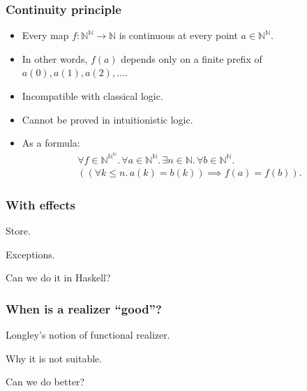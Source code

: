 \documentclass[t]{beamer}
\newcommand{\NN}{\mathbb{N}}
\begin{document}
\begin{frame}
  \frametitle{Continuity principle}

  \begin{itemize}
  \item 
    Every map $f : \NN^\NN \to \NN$ is continuous at every point $a \in
    \NN^\NN$.
  \item 
    In other words, $f(a)$ depends only on a finite prefix of
    $a(0), a(1), a(2), \ldots$.
  \item Incompatible with classical logic.
  \item Cannot be proved in intuitionistic logic.
  \item As a formula:
    \begin{multline*}
      \forall f \in \NN^{\NN^\NN} .\,
      \forall a \in  \NN^\NN.\,
      \exists n \in \NN .\,
      \forall b \in \NN^\NN .\,\\
      ((\forall k \leq n .\, a(k) = b(k)) \implies f(a) = f(b)).
    \end{multline*}
  \end{itemize}

\end{frame}

\begin{frame}
  \frametitle{With effects}

  Store.

  Exceptions.

  Can we do it in Haskell?
\end{frame}

\begin{frame}
  \frametitle{When is a realizer ``good''?}

  Longley's notion of functional realizer.

  Why it is not suitable.

  Can we do better?
\end{frame}
\end{document}
